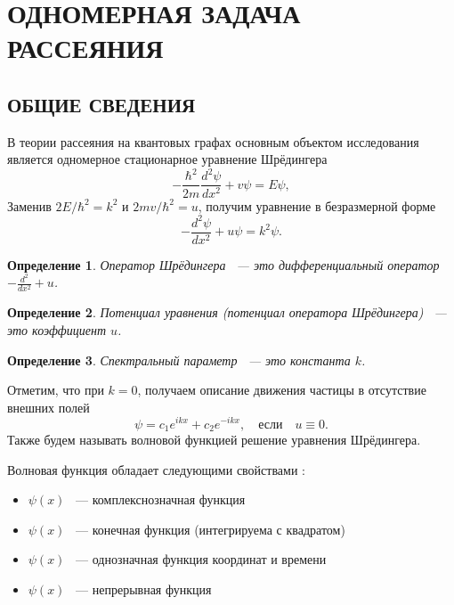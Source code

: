 \documentclass[a4 paper, 12 pt]{extarticle}
\newtheorem{Def}{Определение}[section]
\begin{document}
	
	\newpage
	\section{ОДНОМЕРНАЯ ЗАДАЧА РАССЕЯНИЯ}
	\subsection{ОБЩИЕ СВЕДЕНИЯ}
	В теории рассеяния на квантовых графах основным объектом исследования является одномерное стационарное уравнение Шрёдингера
   \begin{equation*}
   -\frac{\hbar^2}{2m}\frac{d^2\psi}{d x^2}+v\psi=E\psi,
   \end{equation*}
   Заменив $2E/\hbar^2=k^2$ и $2mv/\hbar^2=u$, получим уравнение в безразмерной форме
   \begin{equation}\label{Schred1D}
   -\frac{d^2\psi}{d x^2}+u\psi=k^2\psi.
   \end{equation}
   
   \begin{Def}
   	Оператор Шрёдингера ~--- это дифференциальный оператор \newline  $-\frac{d^2}{d x^2}+u$.
   \end{Def}

   \begin{Def}
   	Потенциал уравнения (потенциал оператора Шрёдингера) ~--- это коэффициент $u$.
   \end{Def}

   \begin{Def}
    Спектральный параметр ~--- это константа $k$.
   \end{Def}
	Отметим, что при $k=0$, получаем описание движения частицы в отсутствие внешних полей
	\begin{equation*}
	\psi=c_1e^{ikx}+c_2e^{-ikx}, \quad \text{если} \quad u\equiv0.
	\end{equation*}
    Также будем называть волновой функцией решение уравнения Шрёдингера.
    
    Волновая функция обладает следующими свойствами \cite{Peisakhovich, Landau}:
    \begin{itemize}
    	\item $\psi\left(x\right)$ ~--- комплекснозначная функция
    	\item $\psi\left(x\right)$ ~--- конечная функция (интегрируема с квадратом)
    	\item $\psi\left(x\right)$ ~--- однозначная функция координат и времени
    	\item $\psi\left(x\right)$ ~--- непрерывная функция
    \end{itemize}
\end{document}

